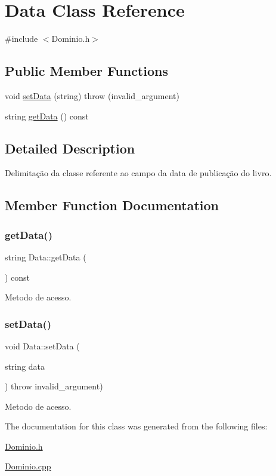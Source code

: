 \hypertarget{class_data}{}\section{Data Class Reference}
\label{class_data}


{\ttfamily \#include $<$Dominio.\+h$>$}

\subsection*{Public Member Functions}
\begin{DoxyCompactItemize}
\item 
void \hyperlink{class_data_a75a50f88bc966f20826a3959717a5acc}{set\+Data} (string)  throw (invalid\+\_\+argument)
\item 
string \hyperlink{class_data_a13f25eafdc138d743e99eb4086d765a2}{get\+Data} () const
\end{DoxyCompactItemize}


\subsection{Detailed Description}
Delimitação da classe referente ao campo da data de publicação do livro. 

\subsection{Member Function Documentation}
\mbox{\label{class_data_a13f25eafdc138d743e99eb4086d765a2}} 
\subsubsection{\texorpdfstring{get\+Data()}{getData()}}
{\footnotesize\ttfamily string Data\+::get\+Data (\begin{DoxyParamCaption}{ }\end{DoxyParamCaption}) const\hspace{0.3cm}{\ttfamily [inline]}}

Metodo de acesso. \mbox{\label{class_data_a75a50f88bc966f20826a3959717a5acc}} 
\subsubsection{\texorpdfstring{set\+Data()}{setData()}}
{\footnotesize\ttfamily void Data\+::set\+Data (\begin{DoxyParamCaption}\item[{string}]{data }\end{DoxyParamCaption}) throw  invalid\+\_\+argument) }

Metodo de acesso. 

The documentation for this class was generated from the following files\+:\begin{DoxyCompactItemize}
\item 
\hyperlink{_dominio_8h}{Dominio.\+h}\item 
\hyperlink{_dominio_8cpp}{Dominio.\+cpp}\end{DoxyCompactItemize}
